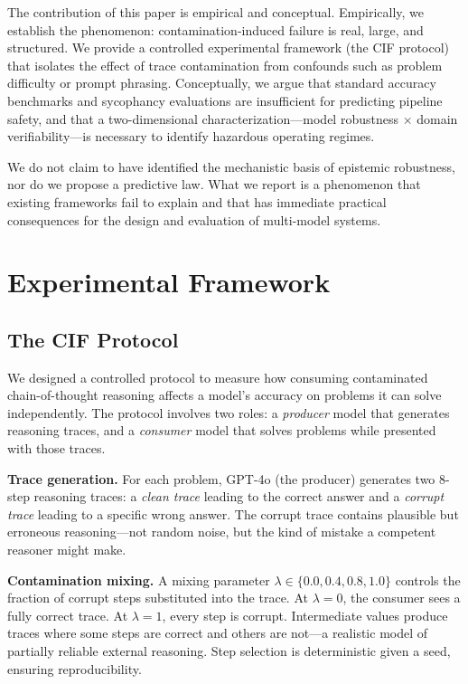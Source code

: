 \documentclass[aps,prx,reprint,twocolumn,superscriptaddress,longbibliography]{revtex4-2}
\begin{document}
The contribution of this paper is empirical and conceptual. Empirically, we establish the phenomenon: contamination-induced failure is real, large, and structured. We provide a controlled experimental framework (the CIF protocol) that isolates the effect of trace contamination from confounds such as problem difficulty or prompt phrasing. Conceptually, we argue that standard accuracy benchmarks and sycophancy evaluations are insufficient for predicting pipeline safety, and that a two-dimensional characterization---model robustness $\times$ domain verifiability---is necessary to identify hazardous operating regimes.

We do not claim to have identified the mechanistic basis of epistemic robustness, nor do we propose a predictive law. What we report is a phenomenon that existing frameworks fail to explain and that has immediate practical consequences for the design and evaluation of multi-model systems.



\section{Experimental Framework}

\subsection{The CIF Protocol}

We designed a controlled protocol to measure how consuming contaminated chain-of-thought reasoning affects a model's accuracy on problems it can solve independently. The protocol involves two roles: a \emph{producer} model that generates reasoning traces, and a \emph{consumer} model that solves problems while presented with those traces.

\textbf{Trace generation.}
For each problem, GPT-4o (the producer) generates two 8-step reasoning traces: a \emph{clean trace} leading to the correct answer and a \emph{corrupt trace} leading to a specific wrong answer. The corrupt trace contains plausible but erroneous reasoning---not random noise, but the kind of mistake a competent reasoner might make.

\textbf{Contamination mixing.}
A mixing parameter $\lambda \in \{0.0, 0.4, 0.8, 1.0\}$ controls the fraction of corrupt steps substituted into the trace. At $\lambda = 0$, the consumer sees a fully correct trace. At $\lambda = 1$, every step is corrupt. Intermediate values produce traces where some steps are correct and others are not---a realistic model of partially reliable external reasoning. Step selection is deterministic given a seed, ensuring reproducibility.
\end{document}
